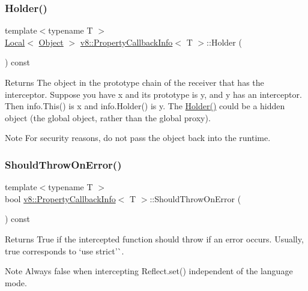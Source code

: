 \subsubsection{\texorpdfstring{Holder()}{Holder()}}
{\footnotesize\ttfamily template$<$typename T $>$ \\
\mbox{\hyperlink{classv8_1_1Local}{Local}}$<$ \mbox{\hyperlink{classv8_1_1Object}{Object}} $>$ \mbox{\hyperlink{classv8_1_1PropertyCallbackInfo}{v8\+::\+Property\+Callback\+Info}}$<$ T $>$\+::Holder (\begin{DoxyParamCaption}{ }\end{DoxyParamCaption}) const}

\begin{DoxyReturn}{Returns}
The object in the prototype chain of the receiver that has the interceptor. Suppose you have {\ttfamily x} and its prototype is {\ttfamily y}, and {\ttfamily y} has an interceptor. Then {\ttfamily info.\+This()} is {\ttfamily x} and {\ttfamily info.\+Holder()} is {\ttfamily y}. The \mbox{\hyperlink{classv8_1_1PropertyCallbackInfo_a66b7ec267f18bd84e8baf0a0e16187b9}{Holder()}} could be a hidden object (the global object, rather than the global proxy).
\end{DoxyReturn}
\begin{DoxyNote}{Note}
For security reasons, do not pass the object back into the runtime. 
\end{DoxyNote}
\mbox{\label{classv8_1_1PropertyCallbackInfo_a82d79a9cdaac9807a0fa17331b159ce9}} 
\subsubsection{\texorpdfstring{Should\+Throw\+On\+Error()}{ShouldThrowOnError()}}
{\footnotesize\ttfamily template$<$typename T $>$ \\
bool \mbox{\hyperlink{classv8_1_1PropertyCallbackInfo}{v8\+::\+Property\+Callback\+Info}}$<$ T $>$\+::Should\+Throw\+On\+Error (\begin{DoxyParamCaption}{ }\end{DoxyParamCaption}) const}

\begin{DoxyReturn}{Returns}
True if the intercepted function should throw if an error occurs. Usually, {\ttfamily true} corresponds to `\textquotesingle{}use strict'\`{}.
\end{DoxyReturn}
\begin{DoxyNote}{Note}
Always {\ttfamily false} when intercepting {\ttfamily Reflect.\+set()} independent of the language mode. 
\end{DoxyNote}
\mbox{\label{classv8_1_1PropertyCallbackInfo_af46300339d2f31d8dc84a06d74ed6c3c}} 
